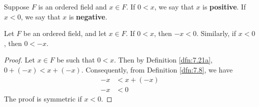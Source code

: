\documentclass[../main.tex]{subfiles}
\begin{document}
\begin{definition}\label{dfn:7.22}
    Suppose $F$ is an ordered field and $x\in F$. If $0<x$, we say that $x$ is \textbf{positive}. If $x<0$, we say that $x$ is \textbf{negative}.
\end{definition}

\begin{lemma}\label{lem:7.23}
    Let $F$ be an ordered field, and let $x\in F$. If $0<x$, then $-x<0$. Similarly, if $x<0$, then $0<-x$.
    \begin{proof}
        Let $x\in F$ be such that $0<x$. Then by Definition \ref{dfn:7.21a}, $0+(-x)<x+(-x)$. Consequently, from Definition \ref{dfn:7.8}, we have
        \begin{align*}
            -x &< x+(-x)\tag*{FA3}\\
            -x &< 0\tag*{FA4}
        \end{align*}
        The proof is symmetric if $x<0$.
    \end{proof}
\end{lemma}
\end{document}
